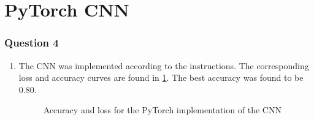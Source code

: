 \documentclass{article}
\begin{document}
\section{PyTorch CNN}
\subsubsection*{Question 4}
\begin{enumerate}[label=(\alph*)]
	\item The CNN was implemented according to the instructions. The corresponding loss and accuracy curves are found in \ref{fig:cnncurves}. The best accuracy was found to be $0.80$.
\begin{figure}[H]
	\centering
	\caption{Accuracy and loss for the PyTorch implementation of the CNN}
	\label{fig:cnncurves}
\end{figure}
\end{enumerate}


\end{document}
